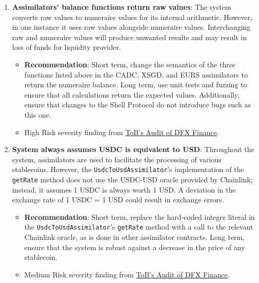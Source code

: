 \begin{enumerate}
\item\textbf{Assimilators’ balance functions return raw values}: The system converts raw values to numeraire values for its internal arithmetic. However, in one instance it uses raw values alongside numeraire values. Interchanging raw and numeraire values will produce unwanted results and may result in loss of funds for liquidity provider.
	\begin{itemize}
	\item\textbf{Recommendation}: Short term, change the semantics of the three functions listed above in the CADC, XSGD, and EURS assimilators to return the numeraire balance. Long term, use unit tests and fuzzing to ensure that all calculations return the expected values. Additionally, ensure that changes to the Shell Protocol do not introduce bugs such as this one.
	\item High Risk severity finding from \href{https://github.com/dfx-finance/protocol/blob/main/audits/2021-05-03-Trail_of_Bits.pdf}{ToB’s Audit of DFX Finance}.
	\end{itemize}

\item\textbf{System always assumes USDC is equivalent to USD}: Throughout the system, assimilators are used to facilitate the processing of various stablecoins. However, the \verb|UsdcToUsdAssimilator|’s implementation of the \verb|getRate| method does not use the USDC-USD oracle provided by Chainlink; instead, it assumes 1 USDC is always worth 1 USD. A deviation in the exchange rate of 1 USDC = 1 USD could result in exchange errors.
	\begin{itemize}
	\item\textbf{Recommendation}: Short term, replace the hard-coded integer literal in the \verb|UsdcToUsdAssimilator|’s \verb|getRate| method with a call to the relevant Chainlink oracle, as is done in other assimilator contracts. Long term, ensure that the system is robust against a decrease in the price of any stablecoin.
	\item Medium Risk severity finding from \href{https://github.com/dfx-finance/protocol/blob/main/audits/2021-05-03-Trail_of_Bits.pdf}{ToB’s Audit of DFX Finance}.
	\end{itemize}


\end{enumerate}
